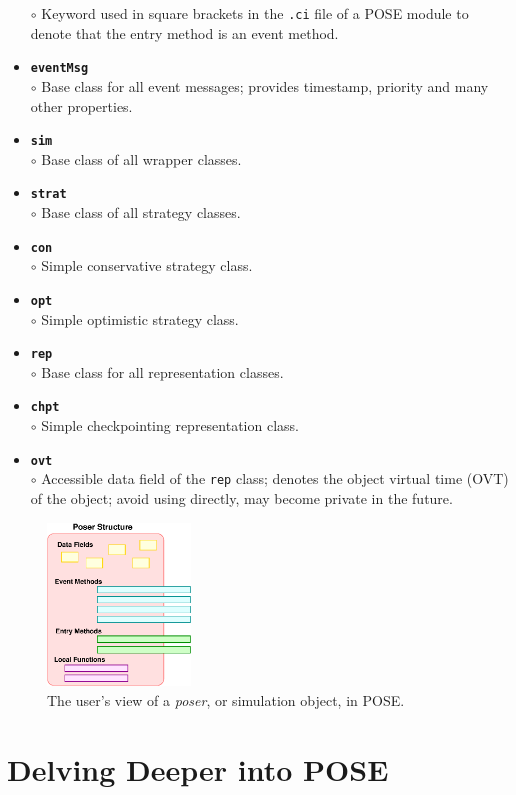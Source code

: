 \documentclass[10pt]{article}
\begin{document}
\begin{itemize}
	$\circ$ Keyword used in square brackets in the {\tt .ci} file
	of a POSE module to denote that the entry method is an event method.
\item {\tt {\bf eventMsg}}\\
	$\circ$ Base class for all event messages; provides timestamp,
	priority and many other properties.
\item {\tt {\bf sim}}\\
	$\circ$ Base class of all wrapper classes.
\item {\tt {\bf strat}}\\
	$\circ$ Base class of all strategy classes.
\item {\tt {\bf con}}\\
	$\circ$ Simple conservative strategy class.
\item {\tt {\bf opt}}\\
	$\circ$ Simple optimistic strategy class.
\item {\tt {\bf rep}}\\
	$\circ$ Base class for all representation classes.
\item {\tt {\bf chpt}}\\
	$\circ$ Simple checkpointing representation class.
\item {\tt {\bf ovt}}\\
	$\circ$ Accessible data field of the {\tt rep} class; denotes
	the object virtual time (OVT) of the object; avoid using
	directly, may become private in the future.
\end{itemize}


\begin{figure}[h]
\begin{center}
\includegraphics[width=1.5in]{base_struct}
\end{center}
\caption{The user's view of a {\it poser}, or simulation object, in POSE.}
\label{fig:base_struct}
\end{figure}

\section{Delving Deeper into POSE}
\end{document}
